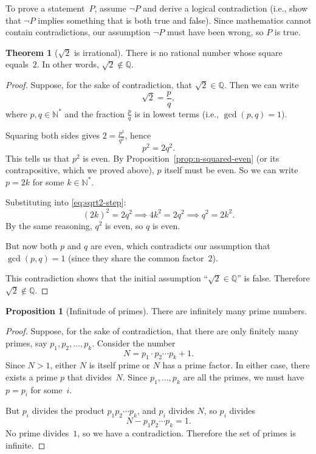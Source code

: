 \documentclass[12pt,a4paper,openany]{book}
\newcommand{\N}{\mathbb{N}}
\newcommand{\Q}{\mathbb{Q}}
\theoremstyle{definition}
\newtheorem{theorem}{Theorem}[chapter]
\newtheorem{proposition}{Proposition}[chapter]
\theoremstyle{remark}
\begin{document}
\begin{strategy}
To prove a statement~$P$, assume $\neg P$ and derive a logical contradiction
(i.e., show that $\neg P$ implies something that is both true and false).
Since mathematics cannot contain contradictions, our assumption $\neg P$ must
have been wrong, so $P$ is true.
\end{strategy}

\begin{theorem}[$\sqrt{2}$ is irrational]\label{thm:sqrt2}
There is no rational number whose square equals~$2$.  In other words,
$\sqrt{2} \notin \Q$.
\end{theorem}

\begin{proof}
Suppose, for the sake of contradiction, that $\sqrt{2} \in \Q$.  Then we can
write
\[
  \sqrt{2} = \frac{p}{q},
\]
where $p,q \in \N^*$ and the fraction $\frac{p}{q}$ is in lowest terms
(i.e., $\gcd(p,q)=1$).

Squaring both sides gives $2 = \frac{p^2}{q^2}$, hence
\begin{equation}\label{eq:sqrt2-step}
  p^2 = 2q^2.
\end{equation}
This tells us that $p^2$ is even.  By Proposition~\ref{prop:n-squared-even}
(or its contrapositive, which we proved above), $p$ itself must be even.
So we can write $p = 2k$ for some $k \in \N^*$.

Substituting into \eqref{eq:sqrt2-step}:
\[
  (2k)^2 = 2q^2 \implies 4k^2 = 2q^2 \implies q^2 = 2k^2.
\]
By the same reasoning, $q^2$ is even, so $q$ is even.

But now both $p$ and $q$ are even, which contradicts our assumption that
$\gcd(p,q)=1$ (since they share the common factor~$2$).

This contradiction shows that the initial assumption ``$\sqrt{2}\in\Q$''
is false.  Therefore $\sqrt{2} \notin \Q$.
\end{proof}

\begin{proposition}[Infinitude of primes]\label{prop:inf-primes}
There are infinitely many prime numbers.
\end{proposition}

\begin{proof}
Suppose, for the sake of contradiction, that there are only finitely many
primes, say $p_1, p_2, \dots, p_k$.  Consider the number
\[
  N = p_1 \cdot p_2 \cdots p_k + 1.
\]
Since $N > 1$, either $N$ is itself prime or $N$ has a prime factor.  In
either case, there exists a prime $p$ that divides~$N$.  Since $p_1, \dots,
p_k$ are all the primes, we must have $p = p_i$ for some~$i$.

But $p_i$ divides the product $p_1 p_2 \cdots p_k$, and $p_i$ divides $N$,
so $p_i$ divides
\[
  N - p_1 p_2 \cdots p_k = 1.
\]
No prime divides~$1$, so we have a contradiction.  Therefore the set of
primes is infinite.
\end{proof}
\end{document}

